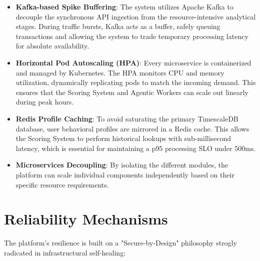 \documentclass[12pt]{report}
\begin{document}
\begin{itemize}
    \item \textbf{Kafka-based Spike Buffering}: The system utilizes Apache Kafka to decouple the synchronous API ingestion from the resource-intensive analytical stages. During traffic bursts, Kafka acts as a buffer, safely queuing transactions and allowing the system to trade temporary processing latency for absolute availability.
    
    \item \textbf{Horizontal Pod Autoscaling (HPA)}: Every microservice is containerized and managed by Kubernetes. The HPA monitors CPU and memory utilization, dynamically replicating pods to match the incoming demand. This ensures that the Scoring System and Agentic Workers can scale out linearly during peak hours.
    
    \item \textbf{Redis Profile Caching}: To avoid saturating the primary TimescaleDB database, user behavioral profiles are mirrored in a Redis cache. This allows the Scoring System to perform historical lookups with sub-millisecond latency, which is essential for maintaining a p95 processing SLO under 500ms.
    
    \item \textbf{Microservices Decoupling}: By isolating the different  modules, the platform can scale individual components independently based on their specific resource requirements.
\end{itemize}

\vspace{2cm}

\section{Reliability Mechanisms}
The platform's resilience is built on a "Secure-by-Design" philosophy strogly radicated in infrastructural self-healing:
\end{document}
